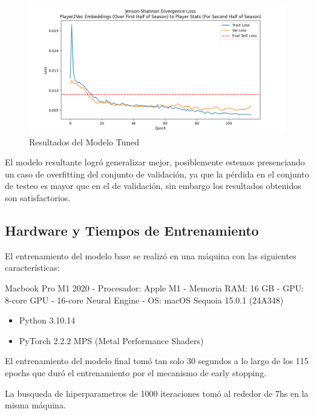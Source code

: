 \documentclass[
  a4paper,
]{article}
\providecommand{\tightlist}{%
  \setlength{\itemsep}{0pt}\setlength{\parskip}{0pt}}
\begin{document}
\begin{figure}
\centering
\includegraphics{recursos_pdf/graficos/p2v_dist_model_oos_190_for_graph_190_for_model_64_5000_0.01_CosineAnnealingLR_tuned_eval_test_loss.png}
\caption{Resultados del Modelo Tuned}
\end{figure}

El modelo resultante logró generalizar mejor, posiblemente estemos
presenciando un caso de overfitting del conjunto de validación, ya que
la pérdida en el conjunto de testeo es mayor que en el de validación,
sin embargo los resultados obtenidos son satisfactorios.

\hypertarget{hardware-y-tiempos-de-entrenamiento}{%
\subsection{Hardware y Tiempos de
Entrenamiento}\label{hardware-y-tiempos-de-entrenamiento}}

El entrenamiento del modelo base se realizó en una máquina con las
siguientes características:

Macbook Pro M1 2020 - Procesador: Apple M1 - Memoria RAM: 16 GB - GPU:
8-core GPU - 16-core Neural Engine - OS: macOS Sequoia 15.0.1 (24A348)

\begin{itemize}
\tightlist
\item
  Python 3.10.14
\item
  PyTorch 2.2.2 MPS (Metal Performance Shaders)
\end{itemize}

El entrenamiento del modelo final tomó tan solo 30 segundos a lo largo
de los 115 epochs que duró el entrenamiento por el mecanismo de early
stopping.

La busqueda de hiperparametros de 1000 iteraciones tomó al rededor de
7hs en la misma máquina.
\end{document}
